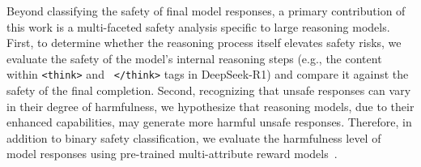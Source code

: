 


Beyond classifying the safety of final model responses, a primary contribution of this work is a multi-faceted safety analysis specific to large reasoning models.  
First, to determine whether the reasoning process itself elevates safety risks, we evaluate the safety of the model's internal reasoning steps (e.g., the content within \texttt{<think>} and \texttt{ </think>} tags in DeepSeek-R1) and compare it against the safety of the final completion. 
Second, recognizing that unsafe responses can vary in their degree of harmfulness, we hypothesize that reasoning models, due to their enhanced capabilities, may generate more harmful unsafe responses. %
Therefore, in addition to binary safety classification, we evaluate the harmfulness level of model responses using pre-trained multi-attribute reward models~\cite{wang2024interpretable,dorka2024quantile}.


